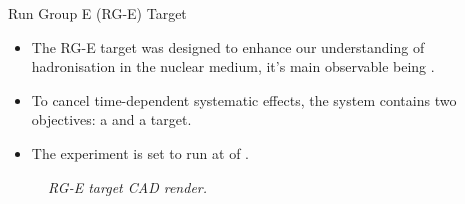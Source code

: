 \begin{frame}{Run Group E (RG-E) Target}
    \label{10.21::rge_target}

    \begin{itemize}
        \item
            The RG-E target was designed to enhance our understanding of hadronisation in the nuclear medium, it's main observable being .

        \item
            To cancel time-dependent systematic effects, the system contains two objectives: a  and a  target.

        \item
            The experiment is set to run at  of .
    \end{itemize}

    \begin{center}
        \begin{figure}[t]

            \scriptsize{\textit{
                RG-E target CAD render.
            }}
        \end{figure}
    \end{center}
\end{frame}
